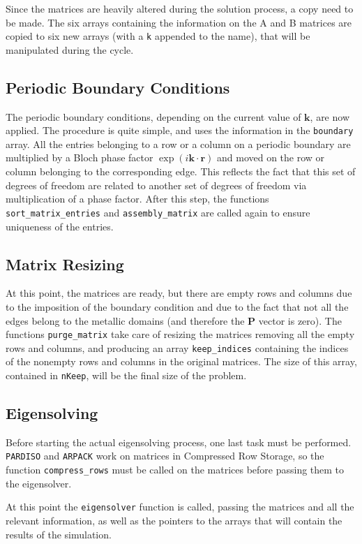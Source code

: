 \documentclass[11pt,a4paper,oneside]{article}
\begin{document}
Since the matrices are heavily altered during the solution process, a copy need to be made. The six arrays containing the information on the A and B matrices are copied to six new arrays (with a {\tt k} appended to the name), that will be manipulated during the cycle.

\subsection{Periodic Boundary Conditions}
The periodic boundary conditions, depending on the current value of $\boldsymbol{k}$, are now applied. The procedure is quite simple, and uses the information in the {\tt boundary} array. All the entries belonging to a row or a column on a periodic boundary are multiplied by a Bloch phase factor $\exp(i \boldsymbol{k} \cdot \boldsymbol{r})$ and moved on the row or column belonging to the corresponding edge. This reflects the fact that this set of degrees of freedom are related to another set of degrees of freedom via multiplication of a phase factor. After this step, the functions {\tt sort\_matrix\_entries} and {\tt assembly\_matrix} are called again to ensure uniqueness of the entries.

\subsection{Matrix Resizing}
At this point, the matrices are ready, but there are empty rows and columns due to the imposition of the boundary condition and due to the fact that not all the edges belong to the metallic domains (and therefore the $\boldsymbol{P}$ vector is zero). The functions {\tt purge\_matrix} take care of resizing the matrices removing all the empty rows and columns, and producing an array {\tt keep\_indices} containing the indices of the nonempty rows and columns in the original matrices. The size of this array, contained in {\tt nKeep}, will be the final size of the problem.

\subsection{Eigensolving}
Before starting the actual eigensolving process, one last task must be performed. {\tt PARDISO} and {\tt ARPACK} work on matrices in Compressed Row Storage, so the function {\tt compress\_rows} must be called on the matrices before passing them to the eigensolver.

At this point the {\tt eigensolver} function is called, passing the matrices and all the relevant information, as well as the pointers to the arrays that will contain the results of the simulation.
\end{document}

